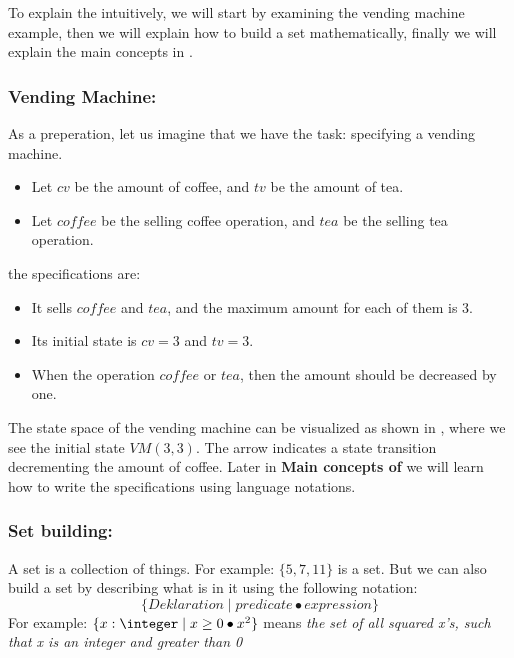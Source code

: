 To explain the \oz{} intuitively, we will start by examining the vending machine example, then we will explain how to build a set mathematically, finally we will explain the main concepts in \oz{}. 

\subsubsection{Vending Machine:}
As a preperation, let us imagine that we have the task: specifying a vending machine.
\begin{itemize}
\item Let $cv$ be the amount of coffee, and $tv$ be the amount of tea.
\item Let $coffee$ be the selling coffee operation, and $tea$ be the selling tea operation.
\end{itemize}
the specifications are:
\begin{itemize}
\item It sells $coffee$ and $tea$, and the maximum amount for each of them is 3.
\item Its initial state is  $cv = 3$ and $tv = 3$.
\item When the operation $coffee$ or $tea$, then the amount should be decreased by one.
\end{itemize} 
The state space of the vending machine can be visualized as shown in , where we see the initial state $VM(3,3)$. The arrow indicates a state transition decrementing the amount of coffee. Later in \textbf{Main concepts of \oz{}} we will learn how to write the specifications using \oz{} language notations.


\subsubsection{Set building:} A set is a collection of things. For example: $\{5, 7, 11\}$ is a set.
But we can also build a set by describing what is in it using the following notation: \[\{Deklaration \mid predicate \bullet expression \}\]
 For example: $\{x: \integer \mid x \geq 0 \bullet x^{2}\}$ means \textit{the set of all squared x's, such that x is an integer and greater than 0}

	
